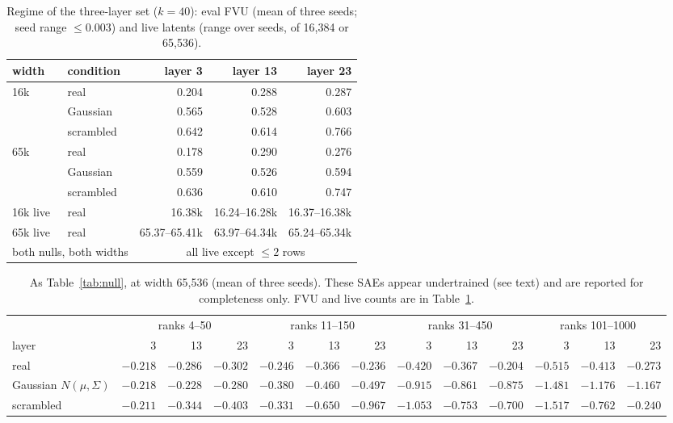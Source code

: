 \documentclass{article}
\newcommand{\Sig}{\Sigma}
\begin{document}
\begin{table}[!htb]
\centering
\caption{Regime of the three-layer set ($k=40$): eval FVU (mean of three seeds; seed range $\le 0.003$) and live latents (range over seeds, of 16,384 or 65,536).}
\label{tab:fvu}
\footnotesize
\setlength{\tabcolsep}{2.5pt}
\begin{tabular}{ll rrr}
\toprule
width & condition & layer 3 & layer 13 & layer 23 \\
\midrule
\multirow{3}{*}{16k} & real & 0.204 & 0.288 & 0.287 \\
 & Gaussian & 0.565 & 0.528 & 0.603 \\
 & scrambled & 0.642 & 0.614 & 0.766 \\
\multirow{3}{*}{65k} & real & 0.178 & 0.290 & 0.276 \\
 & Gaussian & 0.559 & 0.526 & 0.594 \\
 & scrambled & 0.636 & 0.610 & 0.747 \\
\midrule
16k live & real & 16.38k & 16.24--16.28k & 16.37--16.38k \\
65k live & real & 65.37--65.41k & 63.97--64.34k & 65.24--65.34k \\
\multicolumn{2}{l}{both nulls, both widths} & \multicolumn{3}{c}{all live except $\le 2$ rows} \\
\bottomrule
\end{tabular}
\end{table}

\begin{table}[!htb]
\centering
\caption{As Table~\ref{tab:null}, at width 65,536 (mean of three seeds). These SAEs appear undertrained (see text) and are reported for completeness only. FVU and live counts are in Table~\ref{tab:fvu}.}
\label{tab:65k}
\footnotesize
\setlength{\tabcolsep}{3pt}
\begin{tabular}{l rrr rrr rrr rrr}
\toprule
 & \multicolumn{3}{c}{ranks 4--50} & \multicolumn{3}{c}{ranks 11--150} & \multicolumn{3}{c}{ranks 31--450} & \multicolumn{3}{c}{ranks 101--1000} \\
\cmidrule(lr){2-4}\cmidrule(lr){5-7}\cmidrule(lr){8-10}\cmidrule(lr){11-13}
layer & 3 & 13 & 23 & 3 & 13 & 23 & 3 & 13 & 23 & 3 & 13 & 23 \\
\midrule
real & $-0.218$ & $-0.286$ & $-0.302$ & $-0.246$ & $-0.366$ & $-0.236$ & $-0.420$ & $-0.367$ & $-0.204$ & $-0.515$ & $-0.413$ & $-0.273$ \\
Gaussian $N(\mu,\Sig)$ & $-0.218$ & $-0.228$ & $-0.280$ & $-0.380$ & $-0.460$ & $-0.497$ & $-0.915$ & $-0.861$ & $-0.875$ & $-1.481$ & $-1.176$ & $-1.167$ \\
scrambled & $-0.211$ & $-0.344$ & $-0.403$ & $-0.331$ & $-0.650$ & $-0.967$ & $-1.053$ & $-0.753$ & $-0.700$ & $-1.517$ & $-0.762$ & $-0.240$ \\
\bottomrule
\end{tabular}
\end{table}
\end{document}
